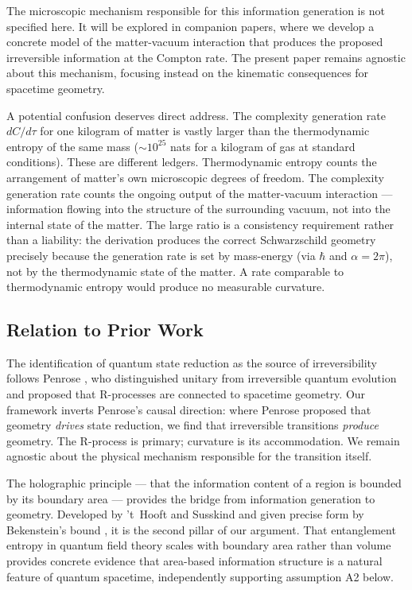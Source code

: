 \documentclass[12pt]{article}
\begin{document}
The microscopic mechanism responsible for this information generation
is not specified here. It will be explored in companion papers,
where we develop a concrete model of the matter-vacuum interaction
that produces the proposed irreversible information at the Compton rate.
The present paper remains agnostic about this mechanism, focusing
instead on the kinematic consequences for spacetime geometry.

A potential confusion deserves direct address.
The complexity generation rate $dC/d\tau$ for one kilogram of matter is
vastly larger than the thermodynamic entropy of the same mass
($\sim 10^{25}$ nats for a kilogram of gas at standard conditions).
These are different ledgers.
Thermodynamic entropy counts the arrangement of matter's own microscopic
degrees of freedom.
The complexity generation rate counts the ongoing output of the
matter-vacuum interaction --- information flowing into the structure of
the surrounding vacuum, not into the internal state of the matter.
The large ratio is a consistency requirement rather than a liability:
the derivation produces the correct Schwarzschild geometry precisely
because the generation rate is set by mass-energy (via $\hbar$ and
$\alpha = 2\pi$), not by the thermodynamic state of the matter.
A rate comparable to thermodynamic entropy would produce no measurable
curvature.

\subsection{Relation to Prior Work}
\label{sec:prior}

The identification of quantum state reduction as the source of
irreversibility follows Penrose \cite{Penrose1994, HawkingPenrose1996},
who distinguished unitary from irreversible quantum evolution and
proposed that R-processes are connected to spacetime geometry.
Our framework inverts Penrose's causal direction: where Penrose proposed
that geometry \emph{drives} state reduction, we find that irreversible
transitions \emph{produce} geometry.
The R-process is primary; curvature is its accommodation.
We remain agnostic about the physical mechanism responsible for the
transition itself.

The holographic principle --- that the information content of a region
is bounded by its boundary area --- provides the bridge from information
generation to geometry.
Developed by 't~Hooft \cite{tHooft1993} and Susskind \cite{Susskind1995}
and given precise form by Bekenstein's bound \cite{Bekenstein1973,
Bekenstein1981}, it is the second pillar of our argument.
That entanglement entropy in quantum field theory scales with boundary
area rather than volume \cite{Srednicki1993} provides concrete evidence
that area-based information structure is a natural feature of quantum
spacetime, independently supporting assumption A2 below.
\end{document}
